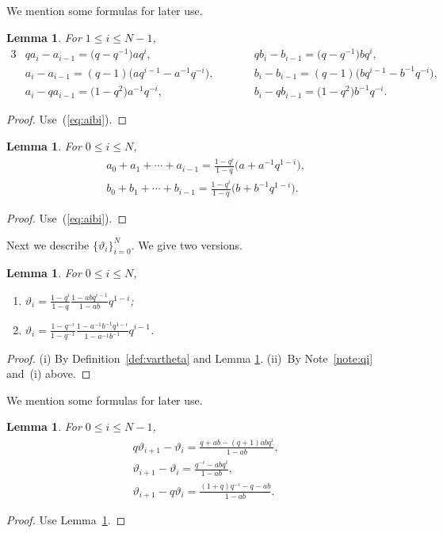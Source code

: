 \documentclass[pdftex]{sigma}
\numberwithin{equation}{section}
\newtheorem{Lemma}[Theorem]{Lemma}
\begin{document}
We mention some formulas for later use.
\begin{Lemma}\label{lem:aidiff}
For $1 \leq i \leq N-1$,
\begin{alignat*}{3}
&qa_i - a_{i-1} = \big(q-q^{-1}\big)aq^{i},\qquad && q b_i - b_{i-1} = \big(q-q^{-1}\big)bq^{i},&\\
&a_i - a_{i-1} = (q-1)\big(aq^{i-1}-a^{-1}q^{-i}\big),\qquad && b_i - b_{i-1} = (q-1)\big(bq^{i-1}-b^{-1}q^{-i}\big),& \\
&a_i - q a_{i-1} = \big(1-q^2\big)a^{-1}q^{-i},\qquad && b_i - q b_{i-1} = \big(1-q^2\big)b^{-1}q^{-i}.
\end{alignat*}
\end{Lemma}
\begin{proof} Use~(\ref{eq:aibi}).
\end{proof}

\begin{Lemma}\label{lem:preL}
For $0 \leq i \leq N$,
\begin{gather*}
a_0 + a_1 + \cdots + a_{i-1} = \frac{1-q^i}{1-q} \big(a + a^{-1} q^{1-i}\big),\\
b_0 + b_1 + \cdots + b_{i-1} = \frac{1-q^i}{1-q} \big(b + b^{-1} q^{1-i}\big).
\end{gather*}
\end{Lemma}
\begin{proof} Use~(\ref{eq:aibi}).
\end{proof}


Next we describe $\lbrace \vartheta_i \rbrace_{i=0}^{N}$.
We give two versions.
\begin{Lemma}
\label{lem:vartheta}
For $0 \leq i \leq N$,
\begin{enumerate}\itemsep=0pt
\item[$(i)$]
$\displaystyle{
\vartheta_i = \frac{1-q^i}{1-q} \frac{1-abq^{i-1}}{1-ab} q^{1-i}}$;
\item[$(ii)$]
$\displaystyle{
 \vartheta_i = \frac{1-q^{-i}}{1-q^{-1}} \frac{1-a^{-1}b^{-1}q^{1-i}}{1-a^{-1}b^{-1}}
 q^{i-1}}$.
\end{enumerate}
\end{Lemma}
\begin{proof} (i) By Definition~\ref{def:vartheta}
and Lemma \ref{lem:preL}.
(ii)~By Note~\ref{note:qi} and~(i) above.
\end{proof}

We mention some formulas for later use.
\begin{Lemma}\label{lem:vthdiff}
For $0 \leq i \leq N-1$,
\begin{gather*}
q \vartheta_{i+1} - \vartheta_i = \frac{q+ab-(q+1)ab q^i}{1-ab},\\
 \vartheta_{i+1} - \vartheta_i = \frac{q^{-i}-abq^i}{1-ab},\\
 \vartheta_{i+1} - q \vartheta_i = \frac{(1+q)q^{-i}-q-ab}{1-ab}.
\end{gather*}
\end{Lemma}
\begin{proof} Use
Lemma~\ref{lem:vartheta}.
\end{proof}
\end{document}
